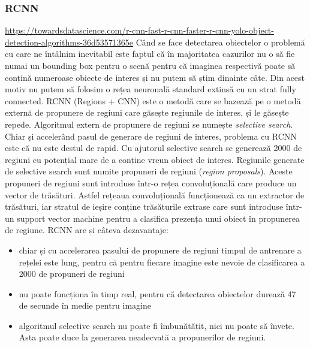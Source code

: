 \subsubsection{RCNN}
\url{https://towardsdatascience.com/r-cnn-fast-r-cnn-faster-r-cnn-yolo-object-detection-algorithms-36d53571365e}
Când se face detectarea obiectelor o problemă cu care ne întâlnim inevitabil este faptul că în majoritatea cazurilor nu o să fie numai un bounding box pentru o scenă pentru că imaginea respectivă poate să conțină numeroase obiecte de interes și nu putem să știm dinainte câte. Din acest motiv nu putem să folosim o rețea neuronală standard extinsă cu un strat fully connected.\newline
RCNN (Regions + CNN) este o metodă care se bazează pe o metodă externă de propunere de regiuni care găsește regiunile de interes, și le găsește repede. Algoritmul extern de propunere de regiuni se numește \textit{selective search}.\newline
Chiar și accelerând pasul de generare de regiuni de interes, problema cu RCNN este că nu este destul de rapid.\newline
Cu ajutorul selective search se generează 2000 de regiuni cu potențial mare de a conține vreun obiect de interes. Regiunile generate de selective search sunt numite propuneri de regiuni (\textit{region proposals}). Aceste propuneri de regiuni sunt introduse într-o rețea convoluțională care produce un vector de trăsături. Astfel rețeaua convoluțională funcționează ca un extractor de trăsături, iar stratul de ieșire conține trăsăturile extrase care sunt introduse într-un support vector machine pentru a clasifica prezența unui obiect în propunerea de regiune.\newline
RCNN are și câteva dezavantaje:
\begin{itemize}
	\item chiar și cu accelerarea pasului de propunere de regiuni timpul de antrenare a rețelei este lung, pentru că pentru fiecare imagine este nevoie de clasificarea a 2000 de propuneri de regiuni
	\item nu poate funcționa în timp real, pentru că detectarea obiectelor durează 47 de secunde în medie pentru imagine
	\item algoritmul selective search nu poate fi îmbunătățit, nici nu poate să învețe. Asta poate duce la generarea neadecvată a propunerilor de regiuni.
\end{itemize}

